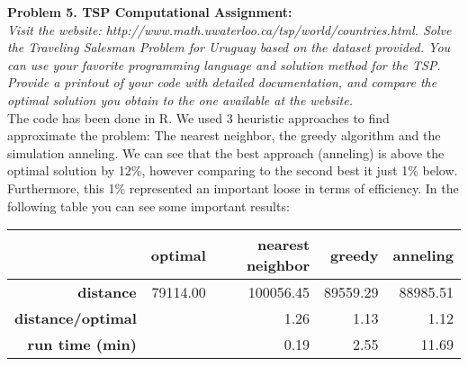 \documentclass[11pt, english]{article}
\begin{document}
\textbf{Problem 5. TSP Computational Assignment:}\\\textit{ Visit the website: http://www.math.uwaterloo.ca/tsp/world/countries.html.
Solve the Traveling Salesman Problem for Uruguay based on the dataset provided. You can use your favorite programming language and solution method for the TSP. Provide a printout of your code with detailed documentation, and compare the optimal solution you obtain to the one available at the website.}\\

The code has been done in R. We used 3 heuristic approaches to find approximate the problem: The nearest neighbor, the greedy algorithm and the simulation anneling. We can see that the best approach (anneling) is above the optimal solution by 12\%, however comparing to the second best it just 1\% below. Furthermore, this 1\% represented an important loose in terms of efficiency. In the following table you can see some important results:

\begin{table}[ht]
	\centering
	\begin{tabular}{rrrrr}
		\hline
		& \textbf{optimal} & \textbf{nearest neighbor} & \textbf{greedy} & \textbf{anneling} \\ 
		\hline
		\textbf{distance} & 79114.00 & 100056.45 & 89559.29 & 88985.51 \\ 
		\textbf{distance/optimal} &  & 1.26 & 1.13 & 1.12 \\ 
		\textbf{run time (min)} &  & 0.19 & 2.55 & 11.69 \\ 
		\hline
	\end{tabular}
\end{table}

\lstset{style=myCustomMatlabStyle2}


\end{document}
